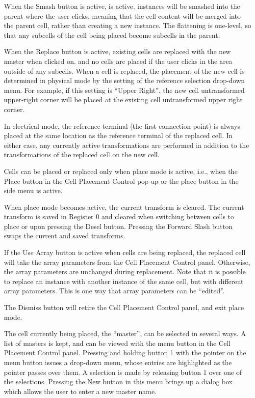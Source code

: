 When the {\cb Smash} button is active, is active, instances will be
smashed into the parent where the user clicks, meaning that the cell
content will be merged into the parent cell, rather than creating a
new instance.  The flattening is one-level, so that any subcells of
the cell being placed become subcells in the parent.

When the {\cb Replace} button is active, existing cells are replaced
with the new master when clicked on.  and no cells are placed if the
user clicks in the area outside of any subcells.  When a cell is
replaced, the placement of the new cell is determined in physical mode
by the setting of the reference selection
drop-down menu.  For example, if this setting is ``Upper Right'', the new cell
untransformed upper-right corner will be placed at the existing cell
untransformed upper right corner.

In electrical mode, the reference terminal (the first connection
point) is always placed at the same location as the reference terminal
of the replaced cell.  In either case, any currently active
transformations are performed in addition to the transformations of
the replaced cell on the new cell.

Cells can be placed or replaced only when place mode is active, i.e.,
when the {\cb Place} button in the {\cb Cell Placement Control} pop-up
or the {\cb place} button in the side menu is active.

When place mode becomes active, the current transform is cleared.  The
current transform is saved in Register 0 and cleared when switching
between cells to place or upon pressing the {\cb Desel} button.
Pressing the {\kb Forward Slash} button swaps the current and saved
transforms.

If the {\cb Use Array} button is active when cells are being replaced,
the replaced cell will take the array parameters from the {\cb Cell
Placement Control} panel.  Otherwise, the array parameters are
unchanged during replacement.  Note that it is possible to replace an
instance with another instance of the same cell, but with different
array parameters.  This is one way that array parameters can be
``edited''.

The {\cb Dismiss} button will retire the {\cb Cell Placement Control}
panel, and exit place mode.

The cell currently being placed, the ``master'', can be selected in
several ways.  A list of masters is kept, and can be viewed with the
menu button in the {\cb Cell Placement Control} panel.  Pressing and
holding button 1 with the pointer on the menu button issues a
drop-down menu, whose entries are highlighted as the pointer passes
over them.  A selection is made by releasing button 1 over one of the
selections.  Pressing the {\cb New} button in this menu brings up a
dialog box which allows the user to enter a new master name.


